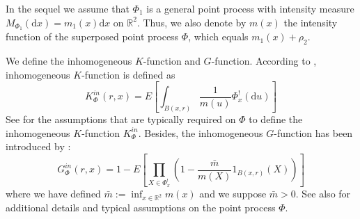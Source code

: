 \documentclass[11pt,a4paper,oneside]{article}
\newcommand{\indicator}{\ensuremath{{1}}}
\newcommand{\dd}{\mathrm d}
\newcommand{\E}{E}
\newcommand{\R}{\mathbb{R}}
\theoremstyle{definition}
\theoremstyle{remark}
\begin{document}
In the sequel we assume that $\Phi_1$ is a general point process with intensity measure $M_{\Phi_1} (\dd x) = m_{1} (x) \dd x $ on $\R^2$. Thus, we also denote by $m(x)$ the intensity function of the superposed point process $\Phi$, which equals $m_{1}(x) + \rho_2$.

We define the inhomogeneous $K$-function and $G$-function. According to \cite{BaddeleyRubakTurner2015}, 
inhomogeneous $K$-function is defined as 
\begin{equation}
    \label{eq:ino_K_def}
    K_{\Phi}^{in} (r, x) = \E \left[ \int_{B (x, r) } \frac{1}{m (u)} \Phi^{!}_x (\dd u)\right]
\end{equation}
See \cite[pg. 243]{BaddeleyRubakTurner2015} for the assumptions that are typically required on $\Phi$ to define the inhomogeneous $K$-function $K^{in}_\Phi $. 
Besides, the inhomogeneous $G$-function has been introduced by \cite{Lieshout11}:
\begin{equation}
    \label{eq:ino_G_def}
    G^{in}_{\Phi}(r,x) = 1- \E \left[  \prod_{X \in \Phi^{!}_x} \left(1- \frac{\bar m}{m (X)} \indicator_{B (x, r)}(X)  \right)\right]
 \end{equation}
 where we have defined $\bar m := \inf_{x \in \R^2}  m(x) $ and we suppose $\bar m >0$.
See also \cite[pg. 277]{BaddeleyRubakTurner2015} for additional details and typical assumptions on the point process $\Phi$. 
\end{document}
